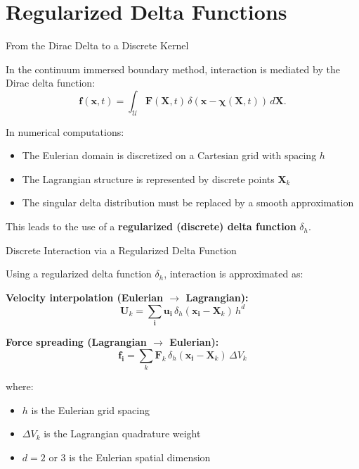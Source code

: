 \documentclass{beamer}
\begin{document}
\section{Regularized Delta Functions}

\begin{frame}{From the Dirac Delta to a Discrete Kernel}

In the continuum immersed boundary method, interaction is mediated by
the Dirac delta function:
\[
\mathbf{f}(\mathbf{x},t)
=
\int_{\mathcal{U}}
\mathbf{F}(\mathbf{X},t)\,
\delta(\mathbf{x}-\boldsymbol{\chi}(\mathbf{X},t))\,d\mathbf{X}.
\]

\medskip

In numerical computations:
\begin{itemize}
    \item The Eulerian domain is discretized on a Cartesian grid with spacing $h$
    \item The Lagrangian structure is represented by discrete points $\mathbf{X}_k$
    \item The singular delta distribution must be replaced by a smooth approximation
\end{itemize}

\medskip

This leads to the use of a \textbf{regularized (discrete) delta function}
$\delta_h$.

\end{frame}

\begin{frame}{Discrete Interaction via a Regularized Delta Function}

Using a regularized delta function $\delta_h$, interaction is approximated as:

\medskip

\textbf{Velocity interpolation (Eulerian $\rightarrow$ Lagrangian):}
\[
\mathbf{U}_k
=
\sum_{\mathbf{i}}
\mathbf{u}_{\mathbf{i}}\,
\delta_h(\mathbf{x}_{\mathbf{i}}-\mathbf{X}_k)\,h^d
\]

\medskip

\textbf{Force spreading (Lagrangian $\rightarrow$ Eulerian):}
\[
\mathbf{f}_{\mathbf{i}}
=
\sum_k
\mathbf{F}_k\,
\delta_h(\mathbf{x}_{\mathbf{i}}-\mathbf{X}_k)\,\Delta V_k
\]

\medskip

where:
\begin{itemize}
    \item $h$ is the Eulerian grid spacing
    \item $\Delta V_k$ is the Lagrangian quadrature weight
    \item $d=2$ or $3$ is the Eulerian spatial dimension
\end{itemize}

\end{frame}
\end{document}
